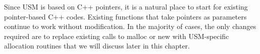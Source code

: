 Since USM is based on C++ pointers, it is a natural place to start for existing pointer-based C++ codes. Existing functions that take pointers as parameters continue to work without modification. In the majority of cases, the only changes required are to replace existing calls to malloc or new with USM-specific allocation routines that we will discuss later in this chapter.\par














































